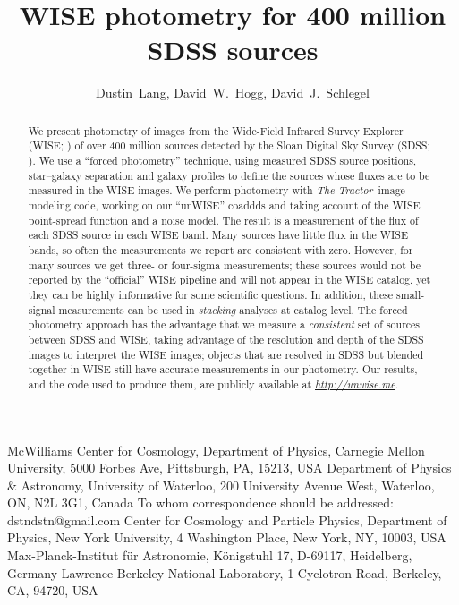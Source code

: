 \documentclass[12pt,preprint]{aastex}
\newcommand{\niceurl}[1]{\href{#1}{\textsl{#1}}}
\newcommand{\Thetractor}{\textsl{The Tractor}}
\begin{document}
\title{WISE photometry for 400 million SDSS sources}
\author{
  Dustin~Lang,
  David~W.~Hogg,
  David~J.~Schlegel}
%
%
{McWilliams Center for Cosmology,
  Department of Physics, Carnegie Mellon University,
  5000 Forbes Ave, Pittsburgh, PA, 15213, USA}
%
{Department of Physics \& Astronomy,
  University of Waterloo,
  200 University Avenue West,
  Waterloo, ON, N2L 3G1, Canada}
%
{To whom correspondence should be addressed: dstndstn@gmail.com}
%
{Center for Cosmology and Particle Physics,
 Department of Physics, New York University,
 4 Washington Place, New York, NY, 10003, USA}
%
{Max-Planck-Institut f\"ur Astronomie,
 K\"onigstuhl 17, D-69117, Heidelberg, Germany}
%
{Lawrence Berkeley National Laboratory,
 1 Cyclotron Road, Berkeley, CA, 94720, USA}
\date{}

\begin{abstract}
We present photometry of images from the Wide-Field Infrared Survey
Explorer (WISE; \citealt{wright}) of over 400 million sources detected
by the Sloan Digital Sky Survey (SDSS; \citealt{york}).
%
%
We use a ``forced photometry'' technique, using measured SDSS source
positions, star--galaxy separation and galaxy profiles to define the
sources whose fluxes are to be measured in the WISE images.
%
We perform photometry with \Thetractor\ image modeling code, working
on our ``unWISE'' coaddds and taking account of the WISE point-spread
function and a noise model.
%
The result is a measurement of the flux of each SDSS source in each
WISE band.  Many sources have little flux in the WISE bands, so often
the measurements we report are consistent with zero.  However, for
many sources we get three- or four-sigma measurements; these sources
would not be reported by the ``official'' WISE pipeline and will not
appear in the
WISE catalog, yet they can be highly informative for some scientific
questions.  In addition, these small-signal measurements can be used
in \emph{stacking} analyses at catalog level.  The forced photometry
approach has the advantage that we measure a \emph{consistent} set of
sources between SDSS and WISE, taking advantage of the resolution and
depth of the SDSS images to interpret the WISE images; objects that
are resolved in SDSS but blended together in WISE still have accurate
measurements in our photometry.
%
Our results, and the code used to produce them, are publicly available
at \niceurl{http://unwise.me}.
\end{abstract}
\end{document}
